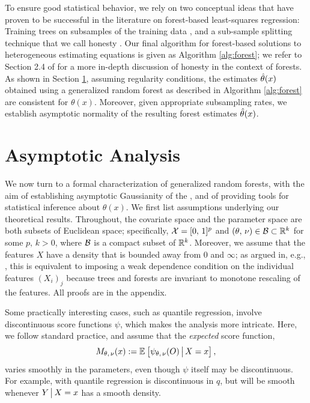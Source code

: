 \documentclass[aos]{imsart}
\theoremstyle{plain}
\theoremstyle{definition}
\theoremstyle{remark}
\begin{document}
\begin{CJK}{UTF8}{gbsn}
{To ensure good statistical behavior,
we rely on two conceptual ideas that have proven to be successful in the literature
on forest-based least-squares regression: Training trees on subsamples of the training data
\citep{mentch2016quantifying,scornet2015consistency,wager2015estimation}, and a sub-sample
splitting technique that we call honesty \citep{biau2012analysis,denil2014narrowing,wager2015estimation}.
Our final algorithm for forest-based solutions to heterogeneous estimating equations is given as
Algorithm \ref{alg:forest}; we refer to Section 2.4 of \citet{wager2015estimation} for a more in-depth discussion
of honesty in the context of forests.
As shown in Section \ref{sec:theory}, 
assuming regularity conditions, the estimates $\hat{\theta}(x)$ obtained using
a generalized random forest as described in Algorithm \ref{alg:forest} are consistent for $\theta(x)$.
Moreover, given appropriate subsampling rates, we establish asymptotic normality of the resulting forest estimates $\hat{\theta}(x)$.


\section{Asymptotic Analysis}
\label{sec:theory}


We now turn to a formal characterization of generalized random forests, with the aim of
establishing asymptotic Gaussianity of the , and of providing
tools for statistical inference about $\theta(x)$.
We first list assumptions underlying our theoretical results.
Throughout, the covariate space and the parameter space are both subsets of Euclidean space;
specifically, $\mathcal{X} = [0, \, 1]^p$ and $(\theta, \, \nu) \in \mathcal{B} \subset \mathbb{R}^k$
for some $p, \, k > 0$, where $\mathcal{B}$ is a compact subset of $\mathbb{R}^k$.
Moreover, we assume that the features $X$ have a density that is bounded away from 0 and $\infty$; as
argued in, e.g., \citet{wager2015uniform}, this is equivalent to imposing a weak dependence condition on the
individual features $(X_i)_j$ because trees and forests are invariant to monotone rescaling of the features.
All proofs are in the appendix.

Some practically interesting cases, such as quantile regression, involve discontinuous score functions $\psi$,
which makes the analysis more intricate. Here, we follow standard practice, and
assume that the \emph{expected} score function,
\begin{equation}
\label{eq:M}
M_{\theta, \, \nu}(x) := \EE{\psi_{\theta, \, \nu}(O) \cond X = x},
\end{equation}
varies smoothly in the parameters, even though $\psi$ itself may be
discontinuous. For example, with quantile regression
 is discontinuous in $q$,
but  will be smooth
whenever $Y\,\big|\, X = x$ has a smooth density.

}
\end{CJK}
\end{document}
